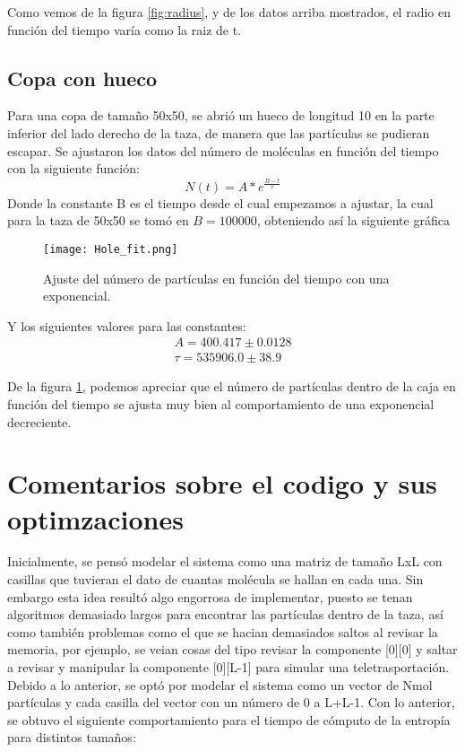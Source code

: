 \documentclass{article}
\begin{document}
  Como vemos de la figura \ref{fig:radius}, y de los datos arriba mostrados, el radio en función del tiempo varía como la raiz de t.
  
    
  
\subsection{Copa con hueco}
Para una copa de tamaño 50x50, se abrió un hueco de longitud 10 en la parte inferior del lado derecho de la taza, de manera que las partículas se pudieran escapar. Se ajustaron los datos del número de moléculas en función del tiempo con la siguiente función:
\begin{equation}
    N(t)= A*e^{\frac{B-t}{\tau}}
\end{equation}
Donde la constante B es el tiempo desde el cual empezamos a ajustar, la cual para la taza de 50x50 se tomó en $B=100000$, obteniendo así la siguiente gráfica
\begin{figure}[H]
   \centering
   \texttt{[image: Hole\_fit.png]}
   \caption{Ajuste del número de partículas en función del tiempo con una exponencial.}
   \label{fig:hole}
 \end{figure}
Y los siguientes valores para las constantes:
\begin{align}
    A= 400.417 \pm 0.0128 \\
    \tau = 535906.0 \pm 38.9
\end{align}

De la figura \ref{fig:hole}, podemos apreciar que el número de partículas dentro de la caja en función del tiempo se ajusta muy bien al comportamiento de una exponencial decreciente.


\section{Comentarios sobre el codigo y sus optimzaciones}

Inicialmente, se pensó modelar el sistema como una matriz de tamaño LxL con casillas que tuvieran el dato de cuantas molécula se hallan en cada una. Sin embargo esta idea resultó algo engorrosa de implementar, puesto se tenan algoritmos demasiado largos para encontrar las partículas dentro de la taza, así como también problemas como el que se hacian demasiados saltos al revisar la memoria, por ejemplo, se veian cosas del tipo revisar la componente [0][0] y saltar a revisar y manipular la componente [0][L-1] para simular una teletrasportación. Debido a lo anterior, se optó por modelar el sistema como un vector de Nmol partículas y cada casilla del vector con un número de 0 a L+L-1. Con lo anterior, se obtuvo el siguiente comportamiento para el tiempo de cómputo de la entropía para distintos tamaños:
\end{document}
